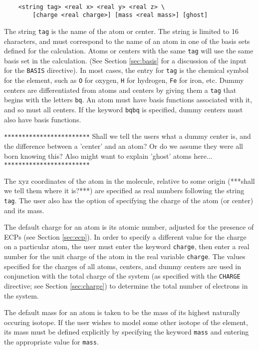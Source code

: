 \begin{verbatim}

    <string tag> <real x> <real y> <real z> \
        [charge <real charge>] [mass <real mass>] [ghost]

\end{verbatim}

The string \verb+tag+ is the name of the atom or center.  The string is limited to
16 characters, and must correspond to the
name of an atom in one of the basis sets defined for the calculation.
Atoms or centers with the same \verb+tag+ will use the same basis set in
the calculation. 
(See Section \ref{sec:basis} for a discussion of the input for the
\verb+BASIS+ directive).  In most cases, the entry for \verb+tag+ is the
chemical symbol for the element, such as \verb+O+ for oxygen, \verb+H+
for hydrogen, \verb+Fe+ for iron, etc.  Dummy centers 
are differentiated from atoms and centers by giving them a \verb+tag+ that 
begins with the letters \verb+bq+.  An atom must have basis functions
associated with it, and so must all centers.  If the keyword \verb+bqbq+
is specified, dummy centers must also have basis functions.

\Large
\verb+************************+
Shall we tell the users what a dummy center is, and the difference
between a 'center' and an atom?  Or do we assume they were all born
knowing this?  Also might want to explain 'ghost' atoms here...
\verb+************************+
\normalsize

The xyz coordinates of the atom in the molecule, relative to some origin
(***shall we tell them where it is?***) are specified as real numbers 
following the string \verb+tag+.  The user also has the option of 
specifying the charge of the atom (or center) and its mass.  

The default charge for an
atom is its atomic number, adjusted for the presence of ECPs (see Section
\ref{sec:ecp}).  In order to specify a different value for the
charge on a particular atom, the user must enter
the keyword \verb+charge+, then enter a real number for the unit charge
of the atom in the real variable \verb+charge+.  The values specified for the charges of 
all atoms, centers, and
dummy centers are used in conjunction with the 
total charge of the system (as specified with the \verb+CHARGE+ directive; 
see Section 
\ref{sec:charge}) to determine the total number of electrons in the system.

The default mass for an atom is taken to be the mass of its highest naturally
occuring isotope.  If the user wishes to model some other isotope of the
element, its mass must be defined explicitly by specifying the keyword 
\verb+mass+ and entering the appropriate value for \verb+mass+.  

